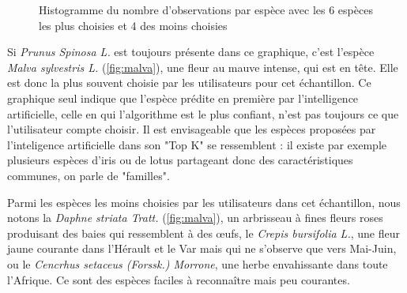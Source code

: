 \documentclass[a4paper,12pt]{article}
\begin{document}
\begin{figure}[H]
    \centering
    
    \caption{Histogramme du nombre d'observations par espèce avec les 6 espèces les plus choisies et 4 des moins choisies}
    \label{fig4}
\end{figure}

\vspace{0.2cm}

Si \textit{Prunus Spinosa L.} est toujours présente dans ce graphique, c'est l'espèce \textit{Malva sylvestris L.} (\autoref{fig:malva}), une fleur au mauve intense, qui est en tête. Elle est donc la plus souvent choisie par les utilisateurs pour cet échantillon. Ce graphique seul indique que l'espèce prédite en première par l'intelligence artificielle, celle en qui l'algorithme est le plus confiant, n'est pas toujours ce que l'utilisateur compte choisir. Il est envisageable que les espèces proposées par l'inteligence artificielle dans son "Top K" se ressemblent : il existe par exemple plusieurs espèces d'iris ou de lotus partageant donc des caractéristiques communes, on parle de "familles".

\vspace{0.2cm}

Parmi les espèces les moins choisies par les utilisateurs dans cet échantillon, nous notons la \textit{Daphne striata Tratt.} (\autoref{fig:malva}), un arbrisseau à fines fleurs roses produisant des baies qui ressemblent à des œufs, le \textit{Crepis bursifolia L.}, une fleur jaune courante dans l'Hérault et le Var mais qui ne s'observe que vers Mai-Juin, ou le \textit{Cencrhus setaceus (Forssk.) Morrone}, une herbe envahissante dans toute l'Afrique. Ce sont des espèces faciles à reconnaître mais peu courantes.
\end{document}

